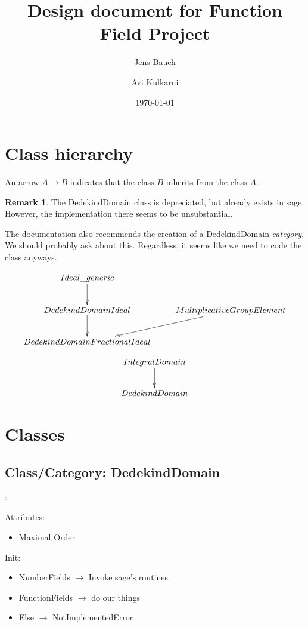 \documentclass{amsart}
\title{Design document for Function Field Project}
\author{Jens Bauch}
\author{Avi Kulkarni}
\date{\today}
\theoremstyle{definition}
\newtheorem*{remark*}{Remark}
\begin{document}
	
	\maketitle
	
	
	\section{Class hierarchy}
	
	An arrow $A \longrightarrow B$ indicates that the class $B$ inherits from the class $A$.
	
	\begin{remark*}
		The DedekindDomain class is depreciated, but already exists in sage. However, the implementation there seems to be unsubstantial. 
		
		The documentation also recommends the creation of a DedekindDomain \emph{category}. We should probably ask about this. Regardless, it seems like we need to code the class anyways.
	\end{remark*}
	
	\[
		\xymatrix{
			Ideal\_generic \ar[d] \\
			DedekindDomainIdeal \ar[d] & MultiplicativeGroupElement \ar[dl]\\
			DedekindDomainFractionalIdeal 
		}
	\]
	
	\hspace{1in}
	
	\[
	\xymatrix{
		IntegralDomain \ar[d] \\
		DedekindDomain
	}
	\]
	
	\hspace{2in}
	
	\phantom{spacing}	

	\section{Classes}

	\subsection{Class/Category: DedekindDomain}: \newline
		
		Attributes:
		\begin{itemize}
			\item 
			Maximal Order
		\end{itemize}
	
		Init:
		\begin{itemize}
			\item
			NumberFields $\rightarrow$ Invoke sage's routines
			\item
			FunctionFields $\rightarrow$ do our things
			\item
			Else $\rightarrow$ NotImplementedError
		\end{itemize}
	
\end{document}
